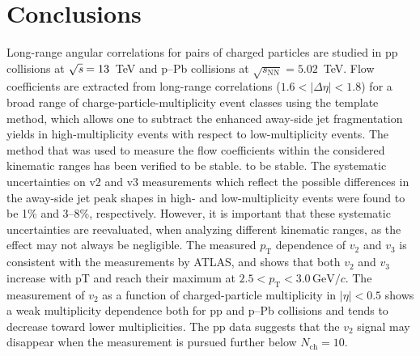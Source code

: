 
\section{Conclusions}
\label{sec:summary}
Long-range angular correlations for pairs of charged particles are studied in pp collisions at ${\sqrt{{\textit s}}}=13$~TeV and p--Pb collisions at $\sqrt{s_\mathrm{NN}} = 5.02$~TeV. Flow coefficients are extracted from long-range correlations ($1.6 <|\Delta\eta| < 1.8$) for a broad range of charge-particle-multiplicity event classes using the template method, which allows one to subtract the enhanced away-side jet fragmentation yields in high-multiplicity events with respect to low-multiplicity events. The method that was used to measure the flow coefficients within the considered kinematic ranges has been verified to be stable.
to be stable. The systematic uncertainties on v2 and v3 measurements which reflect the possible differences in the away-side jet peak shapes in high- and low-multiplicity events were found to be 1\% and 3–8\%, respectively.
However, it is important that these systematic uncertainties are reevaluated, when analyzing different kinematic ranges, as the effect may not always be negligible.
The measured $p_\mathrm{T}$ dependence of $v_2$ and $v_3$ is consistent with the measurements by ATLAS, and shows that both $v_2$ and $v_3$ increase with pT and reach their maximum at $2.5<p_\mathrm{T}<3.0\,\mathrm{GeV}/c$.
The measurement of $v_2$ as a function of charged-particle multiplicity in $|\eta|<0.5$ shows a weak multiplicity dependence both for pp and p--Pb collisions and tends to decrease toward lower multiplicities.
The pp data suggests that the $v_2$ signal may disappear when the measurement is pursued further below $N_{\mathrm{ch}} = 10$. 

